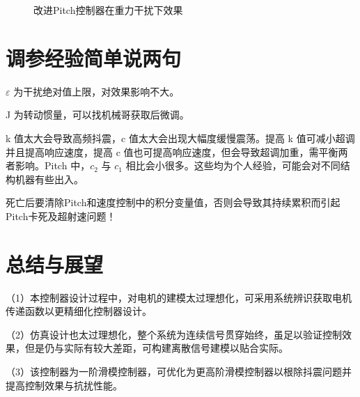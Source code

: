 \documentclass[12pt]{article}
\begin{document}
\begin{figure}[htbp]
\begin{minipage}[t]{0.48\textwidth}
            \caption{改进Pitch控制器在重力干扰下效果}
            \end{minipage}
    \end{figure}

\section{调参经验简单说两句}
$\varepsilon$ 为干扰绝对值上限，对效果影响不大。
\par
J 为转动惯量，可以找机械哥获取后微调。
\par
k 值太大会导致高频抖震，c 值太大会出现大幅度缓慢震荡。提高 k 值可减小超调并且提高响应速度，提高 c 值也可提高响应速度，但会导致超调加重，需平衡两者影响。Pitch 中，$c_2$ 与 $c_1$ 相比会小很多。这些均为个人经验，可能会对不同结构机器有些出入。
\par
死亡后要清除Pitch和速度控制中的积分变量值，否则会导致其持续累积而引起Pitch卡死及超射速问题！

\section{总结与展望}
（1）本控制器设计过程中，对电机的建模太过理想化，可采用系统辨识获取电机传递函数以更精细化控制器设计。
\par
（2）仿真设计也太过理想化，整个系统为连续信号贯穿始终，虽足以验证控制效果，但是仍与实际有较大差距，可构建离散信号建模以贴合实际。
\par
（3）该控制器为一阶滑模控制器，可优化为更高阶滑模控制器以根除抖震问题并提高控制效果与抗扰性能。

\newpage
\end{document}
